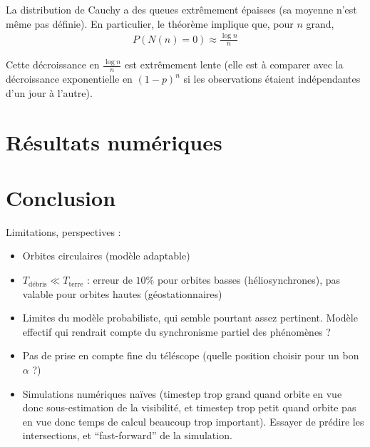 \documentclass[a4paper,11pt]{article}
\numberwithin{section}{part}
\begin{document}
La distribution de Cauchy a des queues extrêmement épaisses (sa
moyenne n'est même pas définie). En particulier, le théorème implique
que, pour $n$ grand,
\begin{align}
  P(N(n) = 0) \approx \frac {\log n}{n}
\end{align}

Cette décroissance en $\frac {\log n} n$ est extrêmement lente (elle
est à comparer avec la décroissance exponentielle en $(1-p)^{n}$ si
les observations étaient indépendantes d'un jour à l'autre).


\section{Résultats numériques}

\section{Conclusion}
Limitations, perspectives :
\begin{itemize}
\item Orbites circulaires (modèle adaptable)
\item $T_{\text{débris}} \ll T_{\text{terre}}$ : erreur de $10\%$ pour
  orbites basses (héliosynchrones), pas valable pour orbites hautes
  (géostationnaires)
\item Limites du modèle probabiliste, qui semble pourtant assez
  pertinent. Modèle effectif qui rendrait compte du synchronisme
  partiel des phénomènes ?
\item Pas de prise en compte fine du téléscope (quelle position
  choisir pour un bon $\alpha$ ?)
\item Simulations numériques naïves (timestep trop grand quand orbite
  en vue donc sous-estimation de la visibilité, et timestep trop petit
  quand orbite pas en vue donc temps de calcul beaucoup trop
  important). Essayer de prédire les intersections, et
  ``fast-forward'' de la simulation.
\end{itemize}






\begin{thebibliography}{99}
\end{thebibliography}
\end{document}
